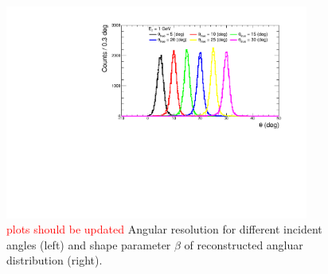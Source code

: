 \documentclass[jkps,preprint,fleqn,showpacs,showkeys]{revtex4}
\newcommand{\XGB}{XGBoost}
\begin{document}





\begin{figure}[!hbt]
\includegraphics[width=0.89\textwidth]{figures/Fig1_reco_def.pdf}
\caption{\textcolor{red}{plots should be updated}
Angular resolution for different incident angles (left) and shape parameter $\beta$ of reconstructed angluar distribution (right).}
\label{fig:angle_reco_def}
\end{figure}
\end{document}

